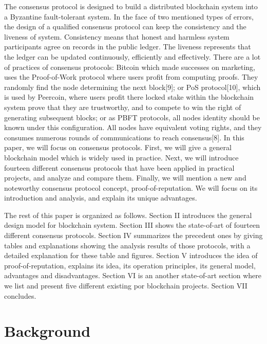 \documentclass[doublespacing]{bmcart}
\begin{document}
\begin{CJK*}{UTF8}{gbsn}
	The consensus protocol is designed to build a distributed blockchain system into a Byzantine fault-tolerant system. In the face of two mentioned types of errors, the design of a qualified consensus protocol can keep the consistency and the liveness of system. Consistency means that honest and harmless system participants agree on records in the public ledger. The liveness represents that the ledger can be updated continuously, efficiently and effectively. There are a lot of practices of consensus protocols: Bitcoin which made successes on marketing, uses the Proof-of-Work protocol where users profit from computing proofs. They randomly find the node determining the next block[9]; or PoS protocol[10], which is used by Peercoin, where users profit there locked stake within the blockchain system prove that they are trustworthy, and to compete to win the right of generating subsequent blocks; or as PBFT protocols, all nodes identity should be known under this configuration. All nodes have equivalent voting rights, and they consumes numerous rounds of communications to reach consensus[8].
 In this paper, we will focus on consensus protocols. First, we will give a general blockchain model which is widely used in practice. Next, we will introduce fourteen different consensus protocols that have been applied in practical projects, and analyze and compare them. Finally, we will mention a new and noteworthy consensus protocol concept, proof-of-reputation. We will focus on its introduction and analysis, and explain its unique advantages.
 
 The rest of this paper is organized as follows. Section II introduces the general design model for blockchain system. Section III shows the state-of-art of fourteen different consensus protocols. Section IV summarizes the precedent ones by giving tables and explanations showing the analysis results of those protocols, with a detailed explanation for these table and figures. Section V introduces the idea of proof-of-reputation, explains its idea, its operation principles, its general model, advantages and disadvantages. Section VI is an another state-of-art section where we list and present five different existing por blockchain projects. Section VII concludes.
\section{Background}



\end{CJK*}
\end{document}
